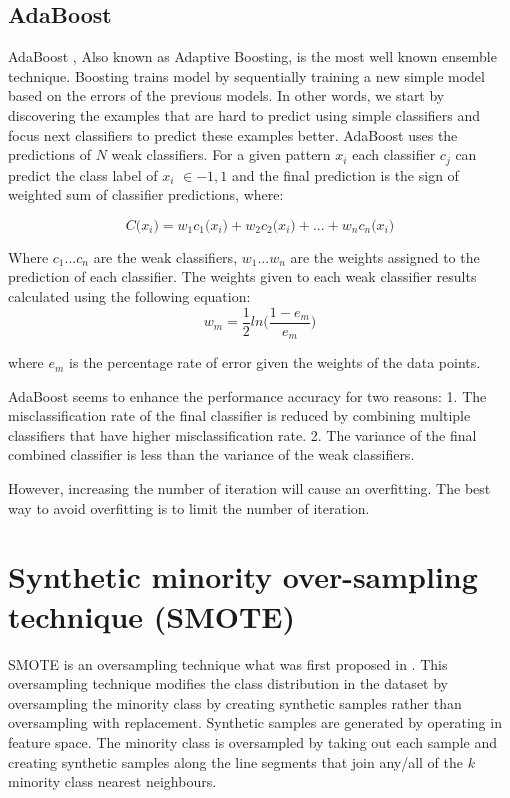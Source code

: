 \documentclass[runningheads,a4paper]{llncs}
\begin{document}
\subsection{AdaBoost}
AdaBoost \cite{Schapire2013}, Also known as Adaptive Boosting, is the most well known ensemble technique. Boosting trains model by sequentially training a new simple model based on the errors of the previous models. In other words, we start by discovering the examples that are hard to predict using simple classifiers and focus next classifiers to predict these examples better.
AdaBoost uses the predictions of $N$ weak classifiers. For a given pattern $x_i$ each classifier $c_j$ can predict the class label of $x_i$ $\in {-1,1}$ and the final prediction is the sign of weighted sum of classifier predictions, where:

\begin{equation}
C \bigl( x_i)=w_1c_1 \bigl (x_i)+w_2c_2 \bigl (x_i)+...+w_nc_n \bigl (x_i)
\end{equation}




Where $c_1 ... c_n$ are the weak classifiers, $w_1 ... w_n$ are the weights assigned to the prediction of each classifier. The weights given to each weak classifier results calculated using the following equation:
\begin{equation}
w_m=\frac{1}{2}ln \bigl ( \frac{1-e_m}{e_m}  )
\end{equation}

where $e_m$  is the percentage rate of error given the weights of the data points.

AdaBoost seems to enhance the performance accuracy for two reasons:
1. The misclassification rate of the final classifier is reduced by combining multiple classifiers that have higher misclassification rate.
2.  The variance of the final combined classifier is less than the variance of the weak classifiers.

However, increasing the number of iteration will cause an overfitting. The best way to avoid overfitting is to limit the number of iteration.


\section{Synthetic minority over-sampling technique (SMOTE)}

SMOTE is an oversampling technique what was first proposed in \cite{chawla2002smote}. This oversampling technique modifies the class distribution in the dataset by oversampling the minority class by creating synthetic samples rather than oversampling with replacement. Synthetic samples are generated by operating in feature space.
The minority class is oversampled by taking out each sample and creating synthetic samples along the line segments that join any/all of the $k$ minority class nearest neighbours. 
\end{document}
